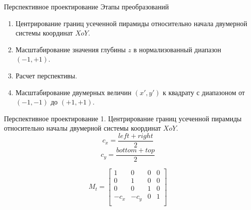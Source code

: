 \documentclass{beamer}
\begin{document}
	\begin{frame}{Перспективное проектирование}
		Этапы преобразований
		\begin{enumerate}
			\item Центрирование границ усеченной пирамиды относительно начала двумерной системы координат $XoY$.
			\item Масштабирование значения глубины $z$ в нормализованный диапазон $(-1, +1)$.
			\item Расчет перспективы.
			\item Масштабирование двумерных величин $(x', y')$ к квадрату с диапазоном от $(-1, -1)$ до $(+1, +1)$.
			\end{enumerate}


		\end{frame}

	\begin{frame}{Перспективное проектирование}
		1. Центрирование границ усеченной пирамиды относительно началы двумерной системы координат $XoY$.
		\[
			c_x = \frac{left + right}{2}
		\]
		\[
			c_y = \frac{bottom + top}{2}
		\]

		\[
			M_t = 
			\begin{bmatrix}
				1 & 0 & 0 & 0 \\
				0 & 1 & 0 & 0 \\
				0 & 0 & 1 & 0 \\
				-c_x & -c_y & 0 & 1 \\
			\end{bmatrix}	
		\]
	\end{frame}
\end{document}
